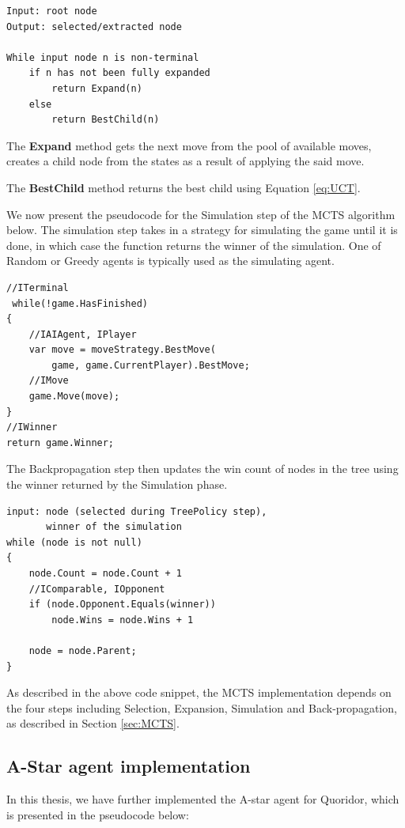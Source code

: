 \begin{lstlisting}
Input: root node
Output: selected/extracted node

While input node n is non-terminal
    if n has not been fully expanded
        return Expand(n)
    else
        return BestChild(n)
\end{lstlisting}

The \textbf{Expand} method gets the next move from the pool of available moves, creates a child node from the states as a result of applying the said move.

The \textbf{BestChild} method returns the best child using Equation \ref{eq:UCT}.

We now present the pseudocode for the Simulation step of the \gls{MCTS} algorithm below. The simulation step takes in a strategy for simulating the game until it is done, in which case the function returns the winner of the simulation. One of Random or Greedy agents is typically used as the simulating agent.

\begin{lstlisting}
//ITerminal
 while(!game.HasFinished)
{
    //IAIAgent, IPlayer
    var move = moveStrategy.BestMove(
        game, game.CurrentPlayer).BestMove;
    //IMove
    game.Move(move);
}
//IWinner
return game.Winner;
\end{lstlisting}

The Backpropagation step then updates the win count of nodes in the tree using the winner returned by the Simulation phase.

\begin{lstlisting}
input: node (selected during TreePolicy step),
       winner of the simulation
while (node is not null)
{
    node.Count = node.Count + 1
    //IComparable, IOpponent
    if (node.Opponent.Equals(winner))
        node.Wins = node.Wins + 1

    node = node.Parent;
}
\end{lstlisting}

As described in the above code snippet, the \ac{MCTS} implementation depends on the four steps including Selection, Expansion, Simulation and Back-propagation, as described in Section \ref{sec:MCTS}.

\subsection{A-Star agent implementation}

In this thesis, we have further implemented the A-star agent for Quoridor, which is presented in the pseudocode below:

